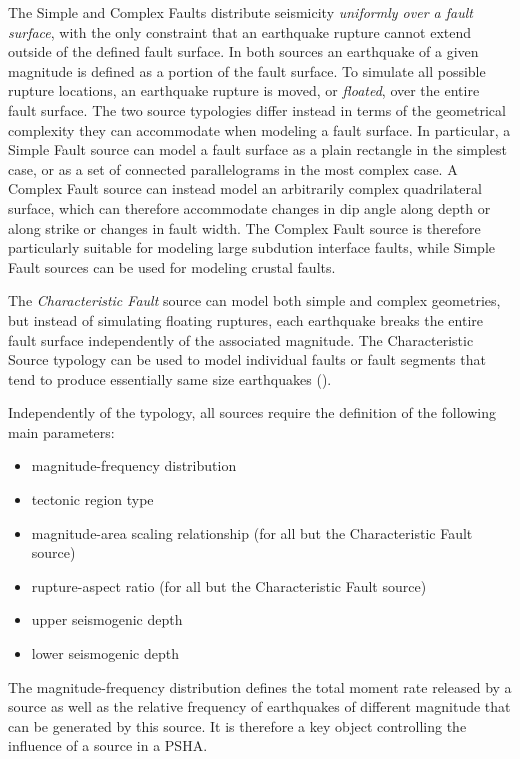 The Simple and Complex Faults distribute seismicity \textit{uniformly over a
fault surface}, with the only constraint that an earthquake rupture cannot
extend outside of the defined fault surface. In both sources an earthquake of a
given magnitude is defined as a portion of the fault surface. 
%
To simulate all possible rupture locations, an earthquake rupture is moved, or
\textit{floated}, over the entire fault surface. The two source typologies
differ instead in terms of the geometrical complexity they can accommodate when
modeling a fault surface. In particular, a Simple Fault source can model a fault
surface as a plain rectangle in the simplest case, or as a set of connected
parallelograms in the most complex case. 
%
A Complex Fault source can instead model an arbitrarily complex
quadrilateral surface, which can therefore accommodate changes in dip angle
along depth or along strike or changes in fault width. The Complex Fault source
is therefore particularly suitable for modeling large subdution interface
faults, while Simple Fault sources can be used for modeling crustal faults. 

The \textit{Characteristic Fault} source can model both simple and complex
geometries, but instead of simulating floating ruptures, each earthquake breaks
the entire fault surface independently of the associated magnitude. The
Characteristic Source typology can be used to model individual faults or fault
segments that tend to produce essentially same size earthquakes
(\cite{schwartscoppersmith1984}).

Independently of the typology, all sources require the definition of the
following main parameters:
\begin{itemize}
\item magnitude-frequency distribution
\item tectonic region type
\item magnitude-area scaling relationship (for all but the Characteristic Fault source)
\item rupture-aspect ratio (for all but the Characteristic Fault source)
\item upper seismogenic depth
\item lower seismogenic depth
\end{itemize}
%
The magnitude-frequency distribution defines the total moment rate released by a
source as well as the relative frequency of earthquakes of different magnitude
that can be generated by this source. It is therefore a key object
controlling the influence of a source in a PSHA. 

